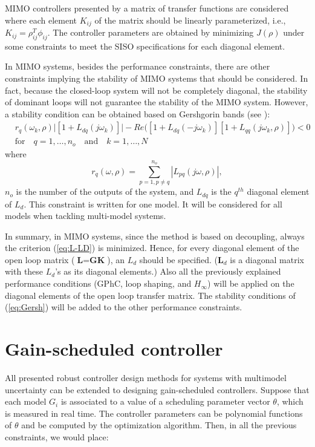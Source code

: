 \documentclass [12pt , a4paper] {report}
\begin{document}
MIMO controllers presented by a matrix of transfer functions are considered where each element $K_{ij}$ of the matrix should be linearly parameterized, i.e., $K_{ij}=\rho_{ij}^T\phi_{ij}$. The controller parameters are obtained by minimizing $J(\rho)$ under some constraints to meet the SISO specifications for each diagonal element. 

In MIMO systems, besides the performance constraints, there are other constraints implying the stability of MIMO systems that should be considered. In fact, because the closed-loop system will not be completely diagonal, the stability of dominant loops will not guarantee the stability of the MIMO system. However, a stability condition can be obtained based on Gershgorin bands (see \cite{GKL10b}):
\begin{align}
\label{eq:Gersh}
& r_q(\omega_k,\rho)\big| [1+L_{dq}(j\omega_k)]\big|-Re\big([1+L_{dq}(-j\omega_k)][1+L_{qq}(j\omega_k,\rho)]\big)<0 \nonumber \\
& \mbox{for} \quad q=1,\ldots,n_o \quad  \mbox{and} \quad k=1,\ldots,N 
\end{align}
where
\[
r_q(\omega,\rho)=\sum_{p=1,p\neq q}^{n_o} |L_{pq}(j\omega,\rho)|,
\]
$n_o$ is the number of the outputs of the system, and $L_{dq}$ is the $q^{th}$ diagonal element of $L_d$. This constraint is written for one model. It will be considered for all models when tackling multi-model systems.

In summary, in MIMO systems, since the method is based on decoupling, always the criterion (\ref{eq:L-LD}) is minimized. Hence, for every diagonal element of the open loop matrix ($\textbf{L}=\textbf{GK}$), an $L_d$ should be specified. ($\textbf{L}_d$ is a diagonal matrix with these $L_d$'s as its diagonal elements.) Also all the previously explained performance conditions (GPhC, loop shaping, and $H_\infty$) will be applied on the diagonal elements of the open loop transfer matrix. The stability conditions of (\ref{eq:Gersh}) will be added to the other performance constraints. 

\section{Gain-scheduled controller}

All presented robust controller design methods for systems with multimodel uncertainty can be extended to designing
gain-scheduled controllers. Suppose that each model $G_i$ is associated to a value of a scheduling parameter vector $\theta$, which is measured in real time. The controller parameters can be polynomial functions of $\theta$ and be computed by the optimization algorithm. Then, in all the previous constraints, we would place:
\end{document}
